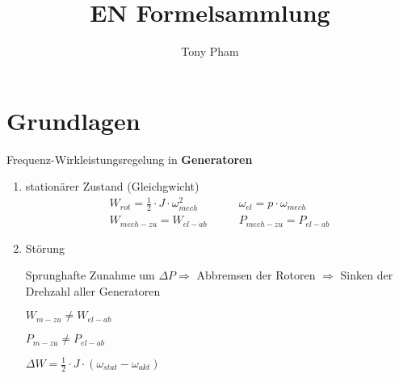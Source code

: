 \documentclass[a4paper,11pt]{article}
\title{EN Formelsammlung}
\author{Tony Pham}
\begin{document}
\maketitle
\tableofcontents
\twocolumn

\section{Grundlagen}
	Frequenz-Wirkleistungsregelung in \textbf{Generatoren}

	\begin{enumerate}
		\item{stationärer Zustand (Gleichgwicht)}
		\begin{align*}
			 W_{rot} = \frac{1}{2} \cdot J \cdot \omega_{mech} ^{2} &\qquad
			 \omega_{el} = p  \cdot \omega_{mech} \\
			 W_{mech-zu} = W_{el-ab} &\qquad
			 P_{mech-zu} = P_{el-ab}
		\end{align*}
		
		
		
	
		
		
		\item{Störung}
		
		Sprunghafte Zunahme um $ \Delta P \Rightarrow$ Abbremsen der Rotoren $\Rightarrow$ Sinken der Drehzahl aller Generatoren
		
		$ W_{m-zu} \neq W_{el-ab} $
		
		$ P_{m-zu} \neq P_{el-ab} $
		
		$ \Delta W = \frac{1}{2} \cdot J \cdot (\omega_{stat} - \omega_{akt}) $
		
	\end{enumerate}

	
\end{document}
